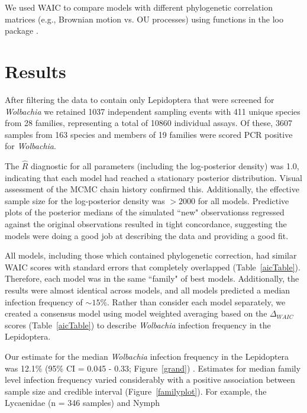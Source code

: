 \documentclass{frontiersSCNS}
\begin{document}
We used WAIC \citep[the widely applicable or Watanabe-Akaike information criterion;][]{Watanabe:2010aa,Gelman:2014aa} to compare models with different phylogenetic correlation matrices (e.g., Brownian motion vs. OU processes) using functions in the loo package \citep{Vehtari:2016aa}. 

\section{Results}
After filtering the \citet{Weinert:2015aa} data to contain only Lepidoptera that were screened for \textit{Wolbachia} we retained 1037 independent sampling events with 411 unique species from 28 families, representing a total of 10860 individual assays. Of these, 3607 samples from 163 species and members of 19 families were scored PCR positive for \textit{Wolbachia}. 

The $\hat{R}$ diagnostic for all parameters (including the log-posterior density) was 1.0, indicating that each model had reached a stationary posterior distribution. Visual assessment of the MCMC chain history confirmed this. Additionally, the effective sample size for the log-posterior density was $> 2000$ for all models. Predictive plots of the posterior medians of the simulated ``new" observationss regressed against the original observations resulted in tight concordance, suggesting the models were doing a good job at describing the data and providing a good fit. %

All models, including those which contained phylogenetic correction, had similar WAIC scores with standard errors that completely overlapped (Table~\ref{aicTable}).  Therefore, each model was in the same ``family" of best models. Additionally, the results were almost identical across models, and all models predicted a median infection frequency of $\sim 15\%$. Rather than consider each model separately, we created a consensus model using model weighted averaging based on the $\Delta_{WAIC}$ scores (Table~\ref{aicTable}) to describe \emph{Wolbachia} infection frequency in the Lepidoptera. 

Our estimate for the median \emph{Wolbachia} infection frequency in the Lepidoptera was 12.1\% (95\% CI = 0.045 - 0.33; Figure~\ref{grand}) . Estimates for median family level infection frequency varied considerably with a positive association between sample size and credible interval (Figure~\ref{familyplot}). For example, the Lycaenidae (n = 346 samples) and Nymph
\end{document}
